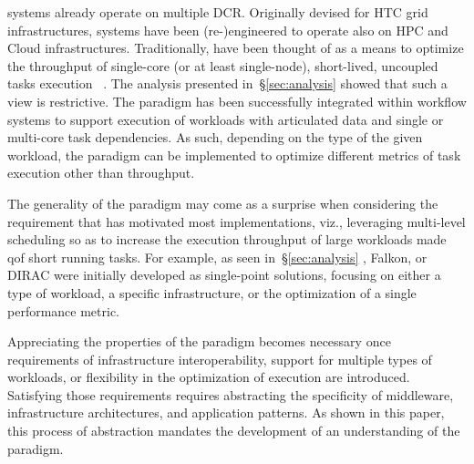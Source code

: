 \documentclass{sig-alternate}
\begin{document}
\pilot systems already operate on multiple DCR. Originally devised for HTC
grid infrastructures, \pilot systems have been (re-)engineered to operate also
on HPC and Cloud infrastructures.
Traditionally, \pilots have been thought of as a means to optimize the
throughput of single-core (or at least single-node), short-lived, uncoupled
tasks execution ~\cite{pordes2007,sfiligoi2009,juve2010}. The analysis presented
in~\S\ref{sec:analysis} showed that such a view is restrictive.  The \pilot
paradigm has been successfully integrated within workflow systems to support
execution of workloads with articulated data and single or multi-core task
dependencies.
As such, depending on the type of the given workload, the \pilot paradigm can be
implemented to optimize different metrics of task execution other than
throughput.

The generality of the \pilot paradigm may come as a surprise when considering
the requirement that has motivated most implementations, viz., leveraging
multi-level scheduling so as to increase the execution throughput of large
workloads made qof short running tasks.  For example, as seen
in~\S\ref{sec:analysis} \panda, Falkon, or DIRAC were initially developed as
single-point solutions, focusing on either a type of workload, a specific
infrastructure, or the optimization of a single performance metric.

Appreciating the properties of the \pilot paradigm becomes necessary once
requirements of infrastructure interoperability, support for multiple types of
workloads, or flexibility in the optimization of execution are introduced.
Satisfying those requirements requires abstracting the specificity of
middleware, infrastructure architectures, and application patterns. As shown in
this paper, this process of abstraction mandates the development of an
understanding of the \pilot paradigm.


\end{document}
